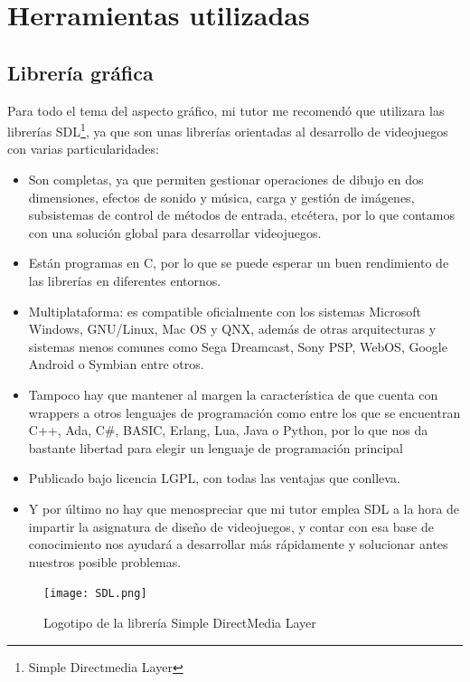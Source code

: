 \section{Herramientas utilizadas}

\subsection{Librería gráfica}

Para todo el tema del aspecto gráfico, mi tutor me recomendó que utilizara las librerías SDL\footnote{Simple
Directmedia Layer}, ya que son unas librerías orientadas al desarrollo de videojuegos con varias particularidades:
\begin{itemize}
    \item Son completas, ya que permiten gestionar operaciones de dibujo en dos dimensiones, efectos de
            sonido y música, carga y gestión de imágenes, subsistemas de control de métodos de entrada,
            etcétera, por lo que contamos con una solución global para desarrollar videojuegos.
    \item Están programas en C, por lo que se puede esperar un buen rendimiento de las librerías en
            diferentes entornos.
    \item Multiplataforma: es compatible oficialmente con los sistemas Microsoft Windows, GNU/Linux,
            Mac OS y QNX, además de otras arquitecturas y sistemas menos comunes como Sega Dreamcast, Sony PSP,
            WebOS, Google Android o Symbian entre otros.
    \item Tampoco hay que mantener al margen la característica de que cuenta con wrappers a otros lenguajes
            de programación como entre los que se encuentran C++, Ada, C\#, BASIC, Erlang, Lua, Java o Python, por
            lo que nos da bastante libertad para elegir un lenguaje de programación principal
    \item Publicado bajo licencia LGPL, con todas las ventajas que conlleva.
    \item Y por último no hay que menospreciar que mi tutor emplea SDL a la hora de impartir la asignatura
            de diseño de videojuegos, y contar con esa base de conocimiento nos ayudará a desarrollar más rápidamente
            y solucionar antes nuestros posible problemas.
\end{itemize}

\begin{figure}[h]
  \label{logo-sdl}
  \begin{center}
    \texttt{[image: SDL.png]}
  \end{center}
  \caption{Logotipo de la librería Simple DirectMedia Layer}
\end{figure}


